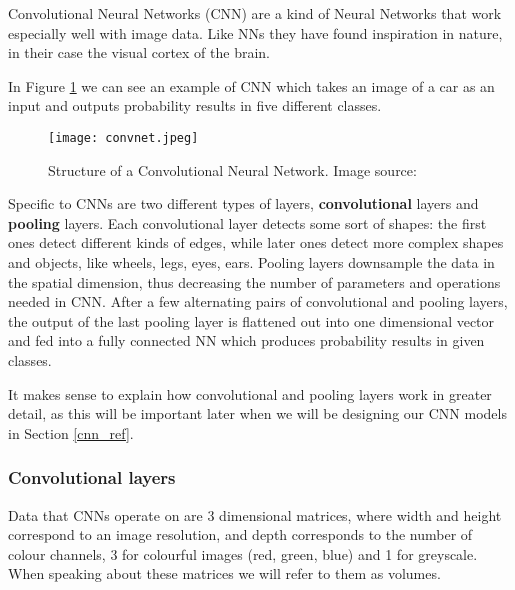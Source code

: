Convolutional Neural Networks (CNN) are a kind of Neural Networks that work especially well with image data.
Like NNs they have found inspiration in nature, in their case the visual cortex of the brain.\footnotemark
{}

In Figure \ref{convnet} we can see an example of CNN which takes an image of a car as an input and outputs probability results in five different classes.
\newline

\begin{figure}[ht]
        \centering
        \texttt{[image: convnet.jpeg]} 
        \caption[Structure of a Convolutional Neural Network.]{Structure of a Convolutional Neural Network. Image source:\cite{cs231n}}
        \label{convnet}
\end{figure}

Specific to CNNs are two different types of layers, \textbf{convolutional} layers and \textbf{pooling} layers.
Each convolutional layer detects some sort of shapes: the first ones detect different kinds of edges, while later ones detect more complex shapes and objects, like wheels, legs, eyes, ears.
Pooling layers downsample the data in the spatial dimension, thus decreasing the number of parameters and operations needed in CNN.
After a few alternating pairs of convolutional and pooling layers, the output of the last pooling layer is flattened out into one dimensional vector and fed into a fully connected NN which produces probability results in given classes.

It makes sense to explain how convolutional and pooling layers work in greater detail, as this will be important later when we will be designing our CNN models in Section \ref{cnn_ref}.


\subsubsection{ Convolutional layers}

Data that CNNs operate on are 3 dimensional matrices, where width and height correspond to an image resolution, and depth corresponds to the number of colour channels, 3 for colourful images (red, green, blue) and 1 for greyscale.
When speaking about these matrices we will refer to them as volumes.

